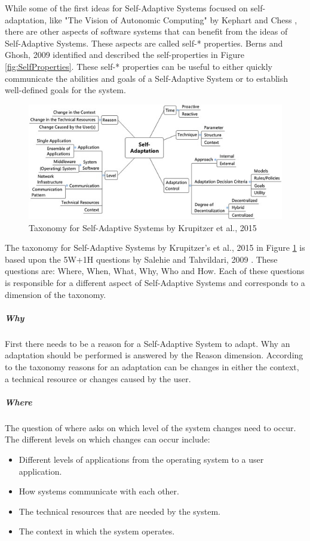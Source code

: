 While some of the first ideas for Self-Adaptive Systems focused on self-adaptation, 
like "The Vision of Autonomic Computing" by Kephart and Chess \cite*{VisionOfAutonomicComputing},
there are other aspects of software systems that can benefit from the ideas of Self-Adaptive Systems.
These aspects are called self-* properties.
Berns and Ghosh, 2009 \cite*{DissectingSelfProperties} identified and described the self-properties in Figure \ref{fig:SelfProperties}.
These self-* properties can be useful to either
quickly communicate the abilities and goals of a Self-Adaptive System
or to establish well-defined goals for the system.


\newpage
\begin{figure}[t!]
    \includegraphics[width=\textwidth]{images/KrupitzerTaxonomy.jpg}
    \caption{Taxonomy for Self-Adaptive Systems by Krupitzer et al., 2015 \cite*{SurveyOnEngineeringApproaches}}
    \label{fig:KrupitzerTaxonomy}
\end{figure}

The taxonomy for Self-Adaptive Systems by Krupitzer's et al., 2015 \cite*{SurveyOnEngineeringApproaches} in Figure \ref{fig:KrupitzerTaxonomy}
is based upon the 5W+1H questions by Salehie and Tahvildari, 2009 \cite*{LandscapeAndResearchChallenges}.
These questions are: Where, When, What, Why, Who and How.
Each of these questions is responsible for a different aspect of Self-Adaptive Systems and corresponds to a dimension of the taxonomy.

\subparagraph*{Why}
First there needs to be a reason for a Self-Adaptive System to adapt. Why an adaptation should be performed is answered by the Reason dimension.
According to the taxonomy reasons for an adaptation can be changes in either the context, a technical resource or changes caused by the user.

\subparagraph*{Where}
The question of where asks on which level of the system changes need to occur.
The different levels on which changes can occur include:
\begin{itemize}
    \item Different levels of applications from the operating system to a user application.
    \item How systems communicate with each other.
    \item The technical resources that are needed by the system.
    \item The context in which the system operates.
\end{itemize}

